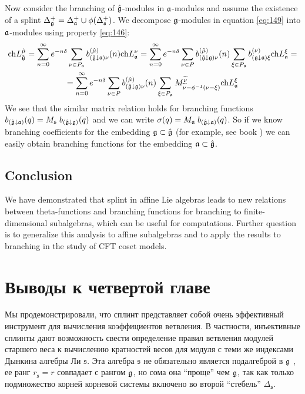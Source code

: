 Now consider the branching of $\hat{\mathfrak{g}}$-modules in $\mathfrak{a}$-modules and
assume the existence of a splint
$\Delta^{+}_{\mathfrak{g}}=\Delta^{+}_{\mathfrak{a}}\cup \phi(\Delta^{+}_{\mathfrak{s}})$.
We decompose $\mathfrak{g}$-modules in equation \eqref{eq:149} into
$\mathfrak{a}$-modules using property \eqref{eq:146}:
\begin{multline}
  \label{eq:125}
  \mathrm{ch}L^{\hat{\mu}}_{\hat{\mathfrak{g}}}=
\sum_{n=0}^{\infty}e^{-n\delta} \sum_{\nu\in P_{\mathfrak{a}}} b^{(\hat{\mu})}_{(\hat{\mathfrak{g}}\downarrow\mathfrak{a})\nu}(n) \mathrm{ch} L^{\nu}_{\mathfrak{a}}=
\sum_{n=0}^{\infty} e^{-n\delta} \sum_{\nu\in P} b^{(\hat{\mu})}_{(\hat{\mathfrak{g}}\downarrow\mathfrak{g} )\nu}(n) \sum_{\xi\in P_{\mathfrak{a}}} b^{(\nu)}_{(\mathfrak{g}\downarrow \mathfrak{a}) \xi}\mathrm{ch} L^{\xi}_{\mathfrak{a}}=\\
=\sum_{n=0}^{\infty} e^{-n\delta} \sum_{\nu\in P} b^{(\hat{\mu})}_{(\hat{\mathfrak{g}}\downarrow\mathfrak{g} )\nu}(n) \sum_{\xi\in P_{\mathfrak{a}}} M^{\widetilde{\nu}}_{  \widetilde{\nu}-\phi^{-1}( \nu-\xi )}\mathrm{ch} L^{\xi}_{\mathfrak{a}}
\end{multline}
We see that the similar matrix relation holds for branching
functions $b_{(\hat{\mathfrak{g}}\downarrow\mathfrak{a})}(q)= M_{\mathfrak{s}}\;
b_{(\hat{\mathfrak{g}}\downarrow\mathfrak{g})}(q)$ and we can write
$\sigma(q)=M_{\mathfrak{a}}\; b_{(\hat{\mathfrak{g}}\downarrow\mathfrak{a})}(q)$. So if we know
branching coefficients for the embedding $\mathfrak{g}\subset\hat{\mathfrak{g}}$ (for
example, see book \cite{kass1990ala}) we can easily obtain
branching functions for the embedding $\mathfrak{a}\subset \hat{\mathfrak{g}}$.
\subsection*{Conclusion}
\label{sec:conclusion} We have demonstrated that splint in affine
Lie algebras leads to new relations between theta-functions and
branching functions for branching to finite-dimensional
subalgebras, which can be useful for computations. Further
question is to generalize this analysis to affine subalgebras and
to apply the results to branching in the study of CFT coset
models.

\section{Выводы к четвертой главе}

\label{sec:4-conclusions}
Мы продемонстрировали, что сплинт представляет собой очень эффективный инструмент для вычисления коэффициентов ветвления.  В частности, инъективные сплинты дают возможность свести определение правил ветвления модулей старшего веса к вычислению кратностей весов для модуля с теми же индексами Дынкина алгебры Ли $\mathfrak{s}$. Эта алгебра $\mathfrak{s}$ не обязательно является подалгеброй в  $\mathfrak{g}$ , ее ранг $r_{\mathfrak{s}}=r$ совпадает с рангом $\mathfrak{g}$, но сома она ``проще'' чем  $\mathfrak{g}$, так как только подмножество корней корневой системы включено во второй ``стебель''  $\Delta_{\mathfrak{s}}$.

